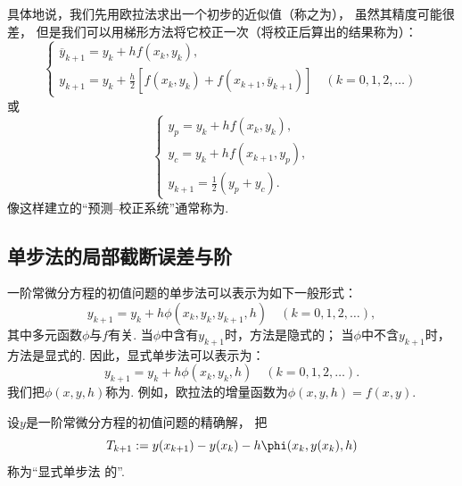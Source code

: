 具体地说，我们先用欧拉法求出一个初步的近似值（称之为），
虽然其精度可能很差，
但是我们可以用梯形方法将它校正一次（将校正后算出的结果称为）：
\begin{equation}
	\begin{cases}
		\overline{y}_{k+1}
		= y_k
		+ h f(x_k,y_k), \\
		y_{k+1}
		= y_k
		+ \frac{h}{2}
		[
			f(x_k,y_k)
			+ f(x_{k+1},\overline{y}_{k+1})
		]
		\quad(k=0,1,2,\dotsc)
	\end{cases}
\end{equation}
或\begin{equation*}
	\begin{cases}
		y_p
		= y_k
		+ h f(x_k,y_k), \\
		y_c
		= y_k + h f(x_{k+1},y_p), \\
		y_{k+1}
		= \frac12 (y_p + y_c).
	\end{cases}
\end{equation*}
像这样建立的“预测--校正系统”通常称为.

\subsection{单步法的局部截断误差与阶}
一阶常微分方程的初值问题的单步法可以表示为如下一般形式：
\begin{equation}\label{equation:常微分方程初值问题的数值解法.单步法的一般形式}
	y_{k+1}
	= y_k
	+ h \phi(x_k,y_k,y_{k+1},h)
	\quad(k=0,1,2,\dotsc),
\end{equation}
其中多元函数\(\phi\)与\(f\)有关.
当\(\phi\)中含有\(y_{k+1}\)时，方法是隐式的；
当\(\phi\)中不含\(y_{k+1}\)时，方法是显式的.
因此，显式单步法可以表示为：
\begin{equation}\label{equation:常微分方程初值问题的数值解法.显式单步法的一般形式}
	y_{k+1}
	= y_k
	+ h \phi(x_k,y_k,h)
	\quad(k=0,1,2,\dotsc).
\end{equation}
我们把\(\phi(x,y,h)\)称为.
例如，欧拉法的增量函数为\(\phi(x,y,h) = f(x,y)\).

\begin{definition}
设\(y\)是一阶常微分方程的初值问题的精确解，
把\begin{equation*}
	T_{k+1}
	\defeq
	y(x_{k+1})
	- y(x_k)
	- h \phi(x_k,y(x_k),h)
\end{equation*}
称为“显式单步法  的”.
\end{definition}

